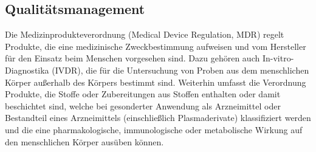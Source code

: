 \documentclass[a4paper, 12pt]{article}
\begin{document}
\subsection{Qualitätsmanagement}\label{Qualitätsmanagement}
Die Medizinprodukteverordnung (Medical Device Regulation, MDR) regelt Produkte, die eine medizinische Zweckbestimmung aufweisen und vom Hersteller für den Einsatz beim Menschen vorgesehen sind. Dazu gehören auch In-vitro-Diagnostika (IVDR), die für die Untersuchung von Proben aus dem menschlichen Körper außerhalb des Körpers bestimmt sind. Weiterhin umfasst die Verordnung Produkte, die Stoffe oder Zubereitungen aus Stoffen enthalten oder damit beschichtet sind, welche bei gesonderter Anwendung als Arzneimittel oder Bestandteil eines Arzneimittels (einschließlich Plasmaderivate) klassifiziert werden und die eine pharmakologische, immunologische oder metabolische Wirkung auf den menschlichen Körper ausüben können. \cite{gesund_minist}
\end{document}

